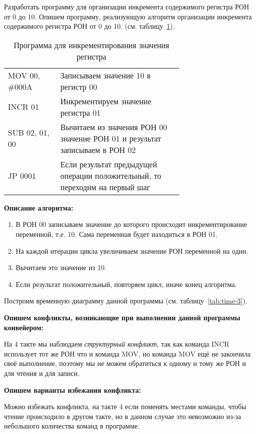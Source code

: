 \documentclass[a4paper,14pt]{extarticle}
\begin{document}
\begin{problem*}
	Разработать программу для организации инкремента содержимого
	регистра РОН от 0 до 10.
	\nonum
	Опишем программу, реализующую алгоритм организации инкремента содержимого
	регистра РОН от 0 до 10. (см. таблицу~\ref{tab:prog-3}).	
	
	\begin{table}[htbp]
		\begin{tabular}{|l|p{0.7\linewidth}|}
			\hline
			\centerboldcell{Команда} & \centerboldcell{Описание} \\ \hline\hline
			MOV 00, \#000A & Записываем значение 10 в регистр 00 \\ \hline
			INCR 01 & Инкрементируем значение регистра 01 \\ \hline
			SUB 02, 01, 00 & Вычитаем из значения РОН 00 значение РОН 01 и результат записываем в РОН 02 \\ \hline
			JP 0001 & Если результат предыдущей операции положительный, то переходим на первый шаг \\ \hline
		\end{tabular}
		\caption{Программа для инкрементирования значения регистра}
		\label{tab:prog-3}
	\end{table}

\textbf{Описание алгоритма:}
\begin{enumerate}
	\item В РОН 00 записываем значение до которого происходит инкрементирование переменной, т.е. 10. Сама переменная будет находиться в РОН 01.
	\item На каждой итерации цикла увеличиваем значение РОН переменной на один.
	\item Вычитаем это значение из 10.
	\item Если результат положительный, повторяем цикл, иначе конец алгоритма.
\end{enumerate}

Построим временную диаграмму данной программы (см. таблицу~\ref{tab:time-3}).

\textbf{Опишем конфликты, возникающие при выполнении данной программы конвейером:}

На 4 такте мы наблюдаем\textit{ структурный конфликт}, так как команда INCR использует тот же РОН что и команда MOV, но команда MOV ещё не закончила своё выполнение, поэтому мы  не можем обратиться к одному и тому же РОН и для чтения и для записи.

\textbf{Опишем варианты избежания конфликта:}

 Можно избежать конфликта, на такте 4 если поменять местами команды, чтобы чтение происходило в другом такте, но в данном случае это невозможно из-за небольшого количества команд в программе.

\end{problem*}	
\end{document}
